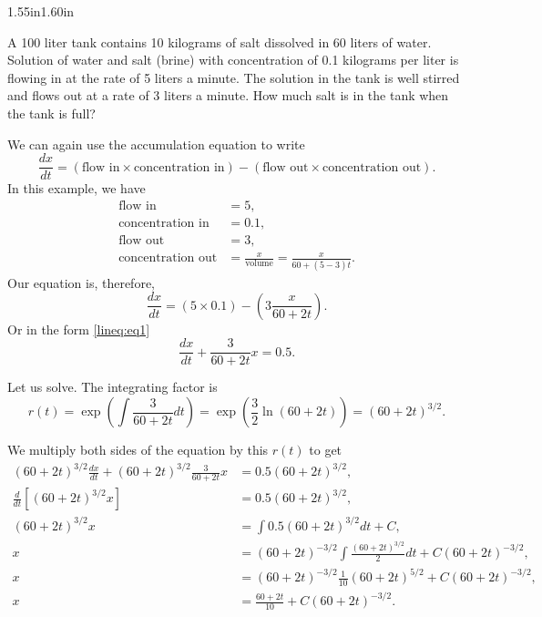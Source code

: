 \begin{mywrapfigsimp}{1.55in}{1.60in}
\noindent
{}
\end{mywrapfigsimp}

\begin{example}
A 100 liter tank contains 10 kilograms of salt dissolved in 60 liters of
water.  Solution of water and salt (brine) with concentration of 0.1
kilograms per
liter is flowing in at the rate of 5 liters a minute.  The solution
in the tank is well stirred and flows out at a rate of 3 liters a minute.
How much salt is in the tank when the tank is full?
\end{example}

\begin{exampleSol}
We can again use the accumulation equation to write
\begin{equation*}
\frac{dx}{dt} =
(\text{flow in} \times \text{concentration in})  - 
(\text{flow out} \times \text{concentration out}) .
\end{equation*}
In this example, we have
\begin{align*}
\text{flow in} &= 5 , \\
\text{concentration in} &= 0.1 , \\
\text{flow out} &= 3 , \\
\text{concentration out} &= \frac{x}{\text{volume}} = \frac{x}{60+(5-3)t} .
\end{align*}
Our equation is, therefore,
\begin{equation*}
\frac{dx}{dt} =
(5 \times 0.1)  - 
\left(3 \frac{x}{60+2t}\right) .
\end{equation*}
Or in the form \eqref{lineq:eq1}
\begin{equation*}
\frac{dx}{dt} +
\frac{3}{60+2t} x
=
0.5 .
\end{equation*}

Let us solve.  The integrating factor is
\begin{equation*}
r(t) = \exp \left( \int \frac{3}{60+2t} dt  \right)
=
\exp \left( \frac{3}{2} \ln (60+2t) \right)
=
{(60+2t)}^{3/2} .
\end{equation*}

We multiply both sides of the equation by this $r(t)$ to get
\begin{align*}
{(60+2t)}^{3/2} \frac{dx}{dt} +
{(60+2t)}^{3/2} \frac{3}{60+2t} x
& =
0.5{(60+2t)}^{3/2} ,\\
\frac{d}{dt}\left[
{(60+2t)}^{3/2} x \right]
& =
0.5{(60+2t)}^{3/2} ,\\
{(60+2t)}^{3/2} x
& =
\int 
0.5{(60+2t)}^{3/2}
dt
+C ,\\
 x
& =
{(60+2t)}^{-3/2} \int 
\frac{
{(60+2t)}^{3/2}
}{2}
dt
+C{(60+2t)}^{-3/2} ,\\
 x
& =
{(60+2t)}^{-3/2}
\frac{1}{10}{(60+2t)}^{5/2}
+C{(60+2t)}^{-3/2} ,\\
 x
& =
\frac{60+2t}{10}
+C{(60+2t)}^{-3/2} .
\end{align*}


\end{exampleSol}
